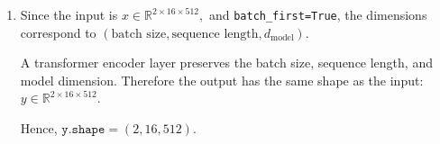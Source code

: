 \begin{solution}
\begin{enumerate}
    $
    = 786432 + 1536 + 262144 + 512
    = 1050624.
    $

    The number of parameters in the feed-forward network is
    $
    (2048 \cdot 512) + 2048 + (512 \cdot 2048) + 512
    $

    $
    = 1048576 + 2048 + 1048576 + 512
    = 2099712.
    $

    The two layer normalization modules have parameters
    $
    2 \times (512 + 512) = 2048.
    $

    Therefore, the total number of trainable parameters is
    $
    1050624 + 2099712 + 2048 = 3152384.
    $

    $
    \boxed{3152384}
    $

    \item Since the input is
    $
    x \in \mathbb{R}^{2 \times 16 \times 512},
    $
    and \texttt{batch\_first=True}, the dimensions correspond to
    $
    (\text{batch size}, \text{sequence length}, d_{\text{model}}).
    $

    A transformer encoder layer preserves the batch size, sequence length, and model dimension. Therefore the output has the same shape as the input:
    $
    y \in \mathbb{R}^{2 \times 16 \times 512}.
    $

    Hence,
    $
    \boxed{\texttt{y.shape} = (2,16,512)}.
    $
\end{enumerate}

\end{solution}











